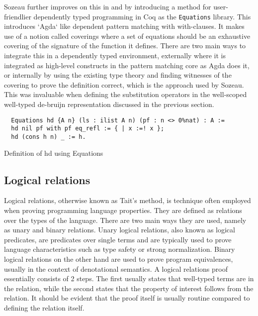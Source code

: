 \documentclass[a4, 12pt, final]{article}
\begin{document}
Sozeau further improves on this in \cite{Sozeau2010} and \cite{Sozeau2019} by introducing a method for user-friendlier dependently typed programming in Coq as the \texttt{Equations} library.
This introduces `Agda` like dependent pattern matching with with-clauses.
It makes use of a notion called coverings where a set of equations should be an exhaustive covering of the signature of the function it defines.
There are two main ways to integrate this in a dependently typed environment, externally where it is integrated as high-level constructs in the pattern matching core as Agda does it, or internally by using the existing type theory and finding witnesses of the covering to prove the definition correct, which is the approach used by Sozeau.
This was invaluable when defining the substitution operators in the well-scoped well-typed de-bruijn representation discussed in the previous section.

\begin{listing}[h]
  \begin{verbatim}
  Equations hd {A n} (ls : ilist A n) (pf : n <> 0%nat) : A :=
  hd nil pf with pf eq_refl := { | x :=! x };
  hd (cons h n) _ := h.
  \end{verbatim}
  \caption{Definition of hd using Equations}
  \label{lst:dt_ilist_hd_equations}
\end{listing}


\subsection{Logical relations}

Logical relations, otherwise known as Tait's method, is technique often employed when proving programming language properties\cite{skorstengaard2019introduction}.
They are defined as relations over the types of the language.
There are two main ways they are used, namely as unary and binary relations.
Unary logical relations, also known as logical predicates, are predicates over single terms and are typically used to prove language characteristics such as type safety or strong normalization.
Binary logical relations on the other hand are used to prove program equivalences, usually in the context of denotational semantics.
A logical relations proof essentially consists of 2 steps.
The first usually states that well-typed terms are in the relation, while the second states that the property of interest follows from the relation.
It should be evident that the proof itself is usually routine compared to defining the relation itself.
\end{document}
